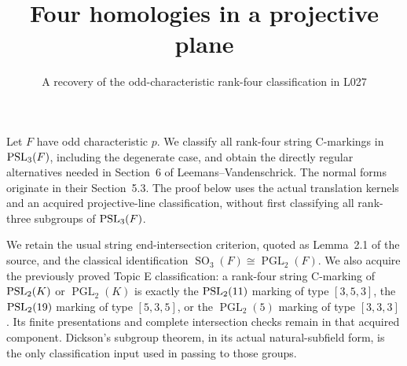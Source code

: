 \documentclass[11pt]{article}
\title{Four homologies in a projective plane}
\author{A recovery of the odd-characteristic rank-four classification in L027}
\date{}
\newcommand{\PGL}{\operatorname{PGL}}\newcommand{\SL}{\operatorname{SL}}
\newcommand{\SO}{\operatorname{SO}}
\begin{document}
\maketitle
Let $F$ have odd characteristic $p$. We classify all rank-four string
C-markings in $\operatorname{PSL}_3(F)$, including the degenerate case, and obtain
the directly regular alternatives needed in Section~6 of
Leemans--Vandenschrick. The normal forms originate in their Section~5.3.
The proof below uses the actual translation kernels and an acquired
projective-line classification, without first classifying all rank-three
subgroups of $\operatorname{PSL}_3(F)$.

We retain the usual string end-intersection criterion, quoted as
Lemma~2.1 of the source, and the classical identification
$\SO_3(F)\cong\PGL_2(F)$. We also acquire the previously proved
Topic E classification: a rank-four string C-marking of $\operatorname{PSL}_2(K)$
or $\PGL_2(K)$ is exactly the $\operatorname{PSL}_2(11)$ marking of type $[3,5,3]$,
the $\operatorname{PSL}_2(19)$ marking of type $[5,3,5]$, or the $\PGL_2(5)$
marking of type $[3,3,3]$. Its finite presentations and complete
intersection checks remain in that acquired component. Dickson's
subgroup theorem, in its actual natural-subfield form, is the only
classification input used in passing to those groups.
\end{document}
